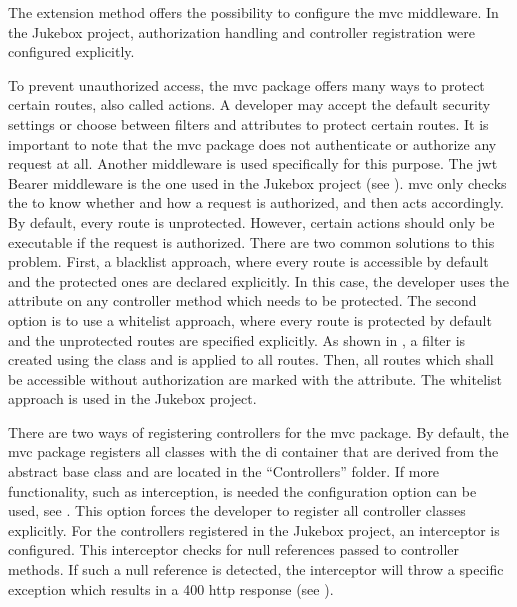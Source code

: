 
The  extension method offers the possibility to configure the \gls{mvc} middleware. In the Jukebox project, authorization handling and controller registration were configured explicitly.

To prevent unauthorized access, the \gls{mvc} package offers many ways to protect certain routes, also called actions. A developer may accept the default security settings or choose between filters and attributes to protect certain routes. It is important to note that the \gls{mvc} package does not authenticate or authorize any request at all. Another middleware is used specifically for this purpose. The \gls{jwt} Bearer middleware is the one used in the Jukebox project (see ). \gls{mvc} only checks the  to know whether and how a request is authorized, and then acts accordingly. By default, every route is unprotected. However, certain actions should only be executable if the request is authorized. There are two common solutions to this problem. First, a blacklist approach, where every route is accessible by default and the protected ones are declared explicitly. In this case, the developer uses the \lstcode{[Authorize]} attribute on any controller method which needs to be protected. The second option is to use a whitelist approach, where every route is protected by default and the unprotected routes are specified explicitly. As shown in , a filter is created using the  class and is applied to all routes. Then, all routes which shall be accessible without authorization are marked with the \lstcode{[AllowAnonymous]} attribute. The whitelist approach is used in the Jukebox project.

There are two ways of registering controllers for the \gls{mvc} package. By default, the \gls{mvc} package registers all classes with the \gls{di} container that are derived from the abstract  base class and are located in the \enquote{Controllers} folder. If more functionality, such as interception, is needed the  configuration option can be used, see . This option forces the developer to register all controller classes explicitly. For the controllers registered in the Jukebox project, an interceptor is configured. This interceptor checks for null references passed to controller methods. If such a null reference is detected, the interceptor will throw a specific exception which results in a 400 \gls{http} response (see ).

